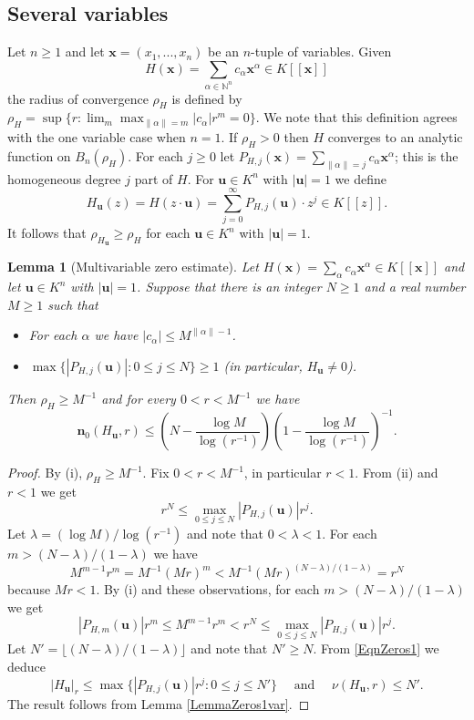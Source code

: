 \documentclass[11pt]{amsart}
\newtheorem{lemma}[theorem]{Lemma}
\theoremstyle{remark}
\numberwithin{equation}{section}
\newcommand{\N}{\mathbb{N}}
\newcommand{\nn}{\mathbf{n}}
\newcommand{\xx}{\mathbf{x}}
\newcommand{\uu}{\mathbf{u}}
\begin{document}
\subsection{Several variables} Let $n\ge 1$ and let $\xx=(x_1,...,x_n)$ be an $n$-tuple of variables. Given 
$$
H(\xx)=\sum_{\alpha\in \N^n} c_\alpha \xx^\alpha\in K[[\xx ]]
$$ 
the radius of convergence $\rho_H$ is defined by $\rho_H= \sup \{r : \lim_m \max_{\|\alpha\| = m} |c_\alpha|r^m=0\}$. We note that this definition agrees with the one variable case when $n=1$. If $\rho_H>0$ then $H$ converges to an analytic function on $B_n(\rho_H)$. For each $j\ge 0$ let $P_{H,j}(\xx)=\sum_{\|\alpha\|=j} c_\alpha \xx^\alpha$; this is the homogeneous degree $j$ part of $H$. For $\uu\in K^n$ with $|\uu|=1$ we define
$$
H_\uu(z)=H(z\cdot \uu)=\sum_{j=0}^\infty P_{H,j}(\uu) \cdot z^j\in K[[z]].
$$
It follows that $\rho_{H_\uu}\ge \rho_H$ for each $\uu\in K^n$ with $|\uu|=1$.
\begin{lemma}[Multivariable zero estimate]\label{LemmaMVzeros} Let $H(\xx)=\sum_\alpha c_\alpha \xx^\alpha\in K[[\xx]]$ and let $\uu\in K^n$ with $|\uu|=1$. Suppose that there is an integer  $N\ge 1$ and a real number $M\ge 1$ such that
\begin{itemize}
\item[(i)] For each $\alpha$ we have $|c_\alpha|\le M^{\|\alpha\|-1}$.
\item[(ii)] $\max\{|P_{H,j}(\uu)| : 0\le j\le N\}\ge 1$ (in particular, $H_\uu\ne 0$). 
\end{itemize}
Then $\rho_H\ge M^{-1}$ and for every $0<r<M^{-1}$ we have
$$
\nn_0(H_\uu,r)\le \left(N-\frac{\log M}{\log (r^{-1})}\right)\left(1-\frac{\log M}{\log (r^{-1})}\right)^{-1}.
$$
\end{lemma}
\begin{proof} 
By (i), $\rho_H\ge M^{-1}$. Fix $0<r<M^{-1}$, in particular $r<1$. From (ii) and $r<1$ we get
$$
r^N\le \max_{0\le j\le N} |P_{H,j}(\uu)|r^j.
$$
Let $\lambda = (\log M)/\log(r^{-1})$ and note that $0<\lambda<1$. For each $m> (N-\lambda)/(1-\lambda)$ we have
$$
M^{m-1}r^m=M^{-1}(Mr)^m<M^{-1}(Mr)^{(N-\lambda)/(1-\lambda)}=r^N
$$
because $Mr<1$. By (i) and these observations, for each $m> (N-\lambda)/(1-\lambda)$ we get
\begin{equation}\label{EqnZeros1}
|P_{H,m}(\uu) |r^m \le M^{m-1} r^m  < r^N \le \max_{0\le j\le N} |P_{H,j}(\uu )|r^j.
\end{equation}
Let $N'=\lfloor (N-\lambda)/(1-\lambda)\rfloor$ and note that $N'\ge N$.  From \eqref{EqnZeros1} we deduce 
$$
|H_{\uu}|_r\le \max\{|P_{H,j}(\uu )|r^j : 0\le j\le N'\}\quad \mbox{ and }\quad \nu(H_\uu, r)\le N'.
$$
The result follows from Lemma \ref{LemmaZeros1var}.
\end{proof}
\end{document}
